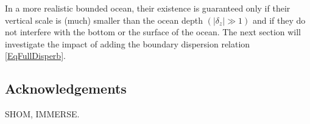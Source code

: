 \documentclass[a4paper,11pt]{article}
\begin{document}

In a more realistic bounded ocean, their existence is guaranteed only if their vertical scale is (much) smaller than the ocean depth $(|\delta_z| \gg 1)$ and if they do not interfere with the bottom or the surface of the ocean. The next section will investigate the impact of adding the boundary dispersion relation \ref{EqFullDisperb}.



\subsection*{Acknowledgements}
SHOM, IMMERSE.



\end{document}
